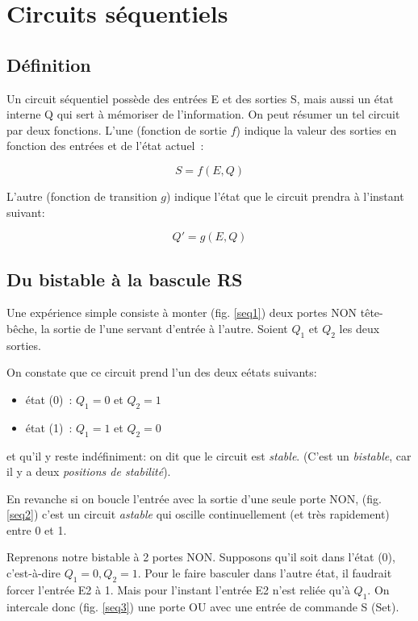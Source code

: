 \chapter{Circuits s\'equentiels}


\section{D\'efinition}

Un circuit s\'equentiel poss\`ede des entr\'ees E et des sorties S,
mais aussi un \'etat interne Q qui sert \`a m\'emoriser de
l'information.  On peut r\'esumer un tel circuit par deux
fonctions. L'une (fonction de sortie $f$) indique la valeur des sorties en
fonction des entr\'ees et de l'\'etat actuel~:

$$	S = f( E , Q )$$ 

L'autre (fonction de transition $g$) indique l'\'etat que le circuit 
prendra \`a l'instant suivant:

$$	Q' = g( E , Q ) $$


\section{Du bistable \`a la bascule RS}

Une exp\'erience simple consiste \`a monter (fig. \ref{seq1})  deux portes NON t\^ete-b\^eche,
la sortie de l'une servant d'entr\'ee \`a l'autre. Soient $Q_1$ et $Q_2$ les deux
sorties. 


On constate que ce circuit prend l'un des deux
 e\'etats suivants:
\begin{itemize}
\item \'etat (0)~:  $Q_1=0$ et $Q_2=1$
\item \'etat (1)~: $Q_1=1$ et $Q_2=0$
\end{itemize}
et qu'il y reste ind\'efiniment: on dit que le circuit est {\em stable}.
(C'est un {\em bistable}, car il y a deux {\em positions de stabilit\'e}).

En revanche si on boucle l'entr\'ee avec la sortie d'une seule porte
NON, (fig. \ref{seq2}) c'est un circuit {\em astable} qui oscille
continuellement (et tr\`es rapidement) entre 0 et 1.

Reprenons notre bistable \`a 2 portes NON. Supposons qu'il soit dans
l'\'etat (0), c'est-à-dire $Q_1=0, Q_2=1$. Pour le faire basculer dans
l'autre \'etat, il faudrait forcer l'entr\'ee E2 \`a 1. Mais pour l'instant 
l'entr\'ee E2 n'est reli\'ee qu'\`a $Q_1$. 
On intercale donc
(fig. \ref{seq3}) une porte OU avec une entr\'ee de commande S (Set).

